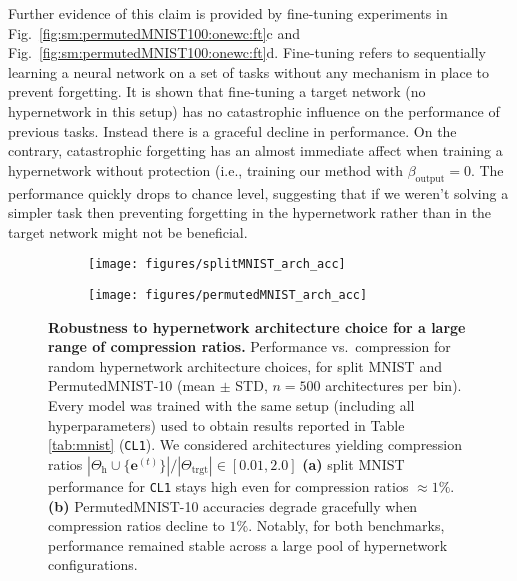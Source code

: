 \documentclass{article}
\begin{document}
Further evidence of this claim is provided by fine-tuning experiments in Fig.~\ref{fig:sm:permutedMNIST100:onewc:ft}c and Fig.~\ref{fig:sm:permutedMNIST100:onewc:ft}d. Fine-tuning refers to sequentially learning a neural network on a set of tasks without any mechanism in place to prevent forgetting. It is shown that fine-tuning a target network (no hypernetwork in this setup) has no catastrophic influence on the performance of previous tasks. Instead there is a graceful decline in performance. On the contrary, catastrophic forgetting has an almost immediate affect when training a hypernetwork without protection (i.e., training our method with $\beta_\text{output} = 0$. The performance quickly drops to chance level, suggesting that if we weren't solving a simpler task then preventing forgetting in the hypernetwork rather than in the target network might not be beneficial.

\begin{figure}
    \centering
    \begin{subfigure}{0.49\linewidth}
    \caption{}
    \texttt{[image: figures/splitMNIST\_arch\_acc]}
    \end{subfigure}
    \begin{subfigure}{0.49\linewidth}
    \caption{}
    \texttt{[image: figures/permutedMNIST\_arch\_acc]}
    \end{subfigure}
    \caption{\textbf{Robustness to hypernetwork architecture choice for a large range of compression ratios.} Performance vs.~compression for random hypernetwork architecture choices, for split MNIST and PermutedMNIST-10 (mean $\pm$ STD, $n=500$ architectures per bin). Every model was trained with the same setup (including all hyperparameters) used to obtain results reported in Table \ref{tab:mnist} (\texttt{CL1}). We considered architectures yielding compression ratios 
    $|\Theta_\text{h}\cup \{\mathbf{e}^{(t)}\}| / |\Theta_\text{trgt}| \in [0.01, 2.0]$
    \textbf{(a)} split MNIST performance for \texttt{CL1} stays high even for compression ratios $\approx 1\%$. \textbf{(b)} PermutedMNIST-10 accuracies degrade gracefully when compression ratios decline to $1\%$. Notably, for both benchmarks, performance remained stable across a large pool of hypernetwork configurations.
    \label{fig:arch_sens}}
\end{figure}
\end{document}
